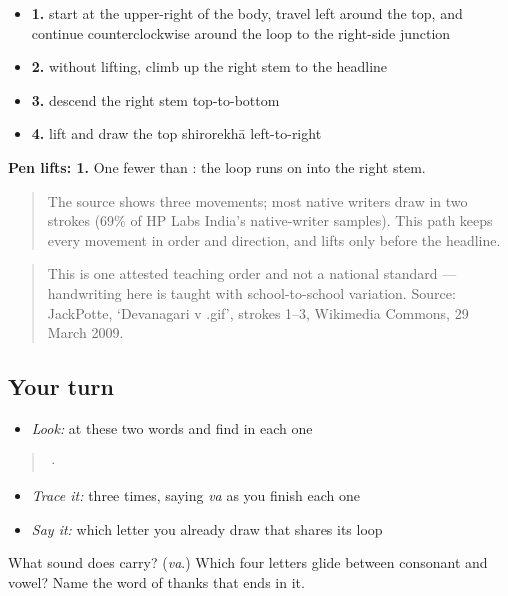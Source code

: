 \begin{itemize}
\raggedright
  \item \textbf{1.} start at the upper-right of the body, travel left around the top, and continue counterclockwise around the loop to the right-side junction
  \item \textbf{2.} without lifting, climb up the right stem to the headline
  \item \textbf{3.} descend the right stem top-to-bottom
  \item \textbf{4.} lift and draw the top shirorekhā left-to-right
\end{itemize}

\textbf{Pen lifts: 1.} One fewer than \textbf{}: the loop runs on into the right stem.

\begin{quote}
The source shows three movements; most native writers draw  in two strokes (69\% of HP Labs India's native-writer samples). This path keeps every movement in order and direction, and lifts only before the headline.
\end{quote}

\begin{quote}
This is one attested teaching order and not a national standard — handwriting here is taught with school-to-school variation. Source: JackPotte, ‘Devanagari v .gif’, strokes 1–3, Wikimedia Commons, 29 March 2009.
\end{quote}

\subsection*{Your turn}
\begin{itemize}
\raggedright
  \item \emph{Look:} at these two words and find  in each one
\end{itemize}

\begin{quote}
  ·  
\end{quote}

\begin{itemize}
\raggedright
  \item \emph{Trace it:}  three times, saying \emph{va} as you finish each one
  \item \emph{Say it:} which letter you already draw that shares its loop
\end{itemize}

\begin{tcolorbox}[breakable,colback=teal!4,colframe=teal!35!black,title={Before you move on}]
What sound does \textbf{} carry? (\emph{va}.) Which four letters glide between consonant and vowel? Name the word of thanks that ends in it.
\end{tcolorbox}

